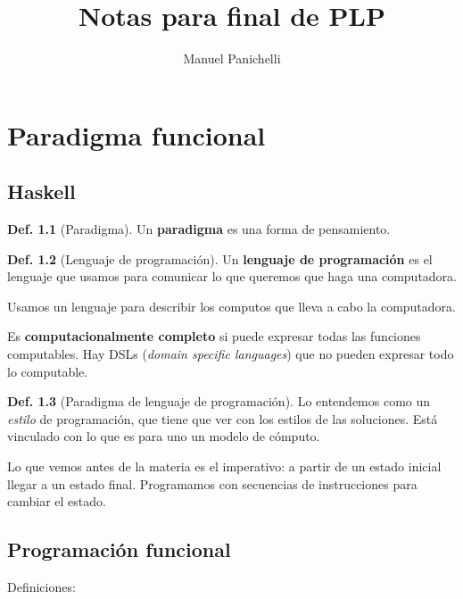 \documentclass{report}
\author{Manuel Panichelli}
\title{Notas para final de PLP}
\theoremstyle{definition} %
\newtheorem{definition}{Def.}[chapter]
\begin{document}
\maketitle

\chapter{Paradigma funcional}

\section{Haskell}

\begin{definition}[Paradigma]
    Un \textbf{paradigma} es una forma de pensamiento.
\end{definition}

\begin{definition}[Lenguaje de programación]
    Un \textbf{lenguaje de programación} es el lenguaje que usamos para
    comunicar lo que queremos que haga una computadora.

    Usamos un lenguaje para describir los computos que lleva a cabo la
    computadora.
    
    Es \textbf{computacionalmente completo} si puede expresar todas las
    funciones computables. Hay DSLs (\textit{domain specific languages}) que no
    pueden expresar todo lo computable.
\end{definition}

\begin{definition}[Paradigma de lenguaje de programación]
    Lo entendemos como un \textit{estilo} de programación, que tiene que ver con
    los estilos de las soluciones. Está vinculado con lo que es para uno un
    modelo de cómputo.

    Lo que vemos antes de la materia es el imperativo: a partir de un estado
    inicial llegar a un estado final. Programamos con secuencias de
    instrucciones para cambiar el estado.
\end{definition}

\section{Programación funcional}

Definiciones:
\end{document}
